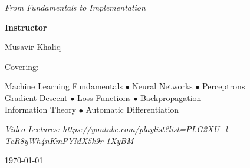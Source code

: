 \begin{titlepage}
    \vspace{1.5cm}
    
    {\Large\itshape From Fundamentals to Implementation\par}
    
    \vfill
    
    {\large\bfseries Instructor\par}
    \vspace{0.3cm}
    {\Large Musavir Khaliq\par}
    
    \vspace{1cm}
    
    {\large Covering:\par}
    \vspace{0.5cm}
    {\normalsize 
    Machine Learning Fundamentals $\bullet$ Neural Networks $\bullet$ Perceptrons\\[3pt]
    Gradient Descent $\bullet$ Loss Functions $\bullet$ Backpropagation\\[3pt]
    Information Theory $\bullet$ Automatic Differentiation
    \par}
    
    \vfill
    
    {\small\itshape Video Lectures: \url{https://youtube.com/playlist?list=PLG2XU_l-TcR8yWh4nKmPYMX5k9r-1XyBM}\par}
    
    \vspace{0.5cm}
    {\large \today\par}
\end{titlepage}


\tableofcontents
\newpage













\appendix

% 
% 



